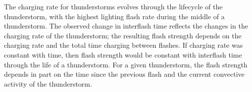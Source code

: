 The charging rate for thunderstorms evolves through the lifecycle of the thunderstorm, with the highest lighting flash rate during the middle of a thunderstorm.
The observed change in interflash time reflects the changes in the charging rate of the thunderstorm; the resulting flash strength depends on the charging rate and the total time charging between flashes.
If charging rate was constant with time, then flash strength would be constant with interflash time through the life of a thunderstorm.
For a given thunderstorm, the flash strength depends in part on the time since the previous flash and the current convective activity of the thunderstorm.
